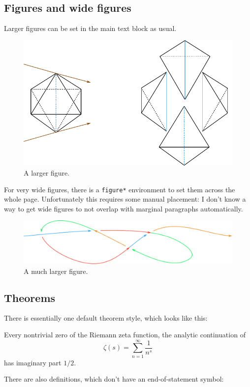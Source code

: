 \documentclass{sl2art}
\begin{document}
\subsection{Figures and wide figures}
Larger figures can be set in the main text block as usual.
\begin{figure}
  \centering
  \includegraphics{fig-example.pdf}
  \caption{A larger figure.}%
  \label{fig:fig-example}
\end{figure}
For very wide figures, there is a \texttt{figure*} environment to set them across the whole page.
Unfortunately this requires some manual placement: I don't know a way to get wide figures to not overlap with marginal paragraphs automatically.
\begin{figure}
  \centering
  \includegraphics{wide-fig-example.pdf}
  \caption{A much larger figure.}%
  \label{fig:wide-fig-example}
\end{figure}

\subsection{Theorems}
There is essentially one default theorem style, which looks like this:
\begin{proposition}
  Every nontrivial zero of the Riemann zeta function, the analytic continuation of
  \[
    \zeta(s) = \sum_{n=1}^{\infty} \frac{1}{n^s}
  \]
  has imaginary part \(1/2\).
\end{proposition}
There are also definitions, which don't have an end-of-statement symbol:
\end{document}
